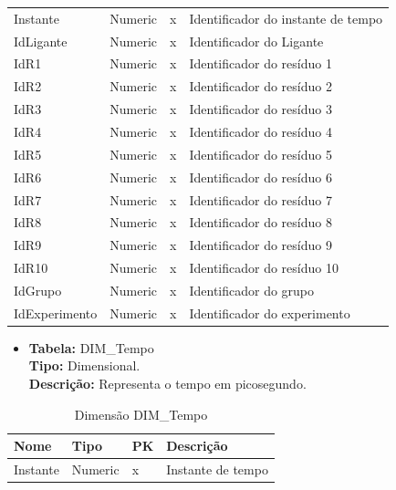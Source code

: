 \begin{table}[!htbp]
\begin{tabular}{@{}llll@{}}
	Instante 	    		 & Numeric        &  x          & Identificador do instante de tempo  \\
	IdLigante 	    		 & Numeric        &  x          & Identificador do Ligante 			\\
	IdR1 				     & Numeric        &  x          & Identificador do resíduo 1   	\\
	IdR2 				     & Numeric        &  x          & Identificador do resíduo 2   	\\
	IdR3 				     & Numeric        &  x          & Identificador do resíduo 3   	\\
	IdR4 				     & Numeric        &  x          & Identificador do resíduo 4   	\\
	IdR5 				     & Numeric        &  x          & Identificador do resíduo 5   	\\
	IdR6 				     & Numeric        &  x          & Identificador do resíduo 6   	\\
	IdR7 				     & Numeric        &  x          & Identificador do resíduo 7   	\\
	IdR8 				     & Numeric        &  x          & Identificador do resíduo 8   	\\
	IdR9 				     & Numeric        &  x          & Identificador do resíduo 9   	\\
	IdR10			 	     & Numeric        &  x          & Identificador do resíduo 10  	\\	
	IdGrupo			 	     & Numeric        &  x          & Identificador do grupo  		\\	
	IdExperimento 			 & Numeric        &  x          & Identificador do experimento 	\\ \bottomrule
	\end{tabular}
\end{table}

\begin{itemize}
	\item
		\textbf{Tabela:} DIM\_Tempo \\
		\textbf{Tipo:} Dimensional. \\
		\textbf{Descrição:} Representa o tempo em picosegundo. \\
\end{itemize}
\begin{table}[h]
	\caption{Dimensão DIM\_Tempo}
	\centering
	\begin{tabular}{@{}llll@{}}
	\toprule
	\textbf{Nome} 	& \textbf{Tipo} & \textbf{PK} & \textbf{Descrição}           		\\ \midrule			
	Instante 		& Numeric 	       &  x           & Instante de tempo 					\\ \bottomrule
	\end{tabular}
\end{table}

